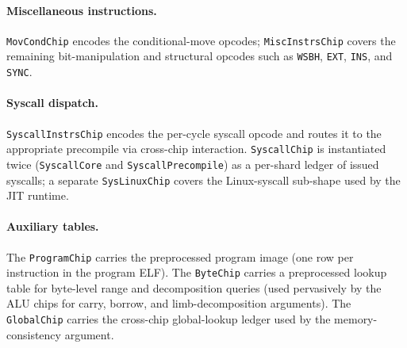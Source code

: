 \paragraph{Miscellaneous instructions.} \texttt{MovCondChip} encodes the conditional-move opcodes; \texttt{MiscInstrsChip} covers the remaining bit-manipulation and structural opcodes such as \texttt{WSBH}, \texttt{EXT}, \texttt{INS}, and \texttt{SYNC}.

\paragraph{Syscall dispatch.} \texttt{SyscallInstrsChip} encodes the per-cycle syscall opcode and routes it to the appropriate precompile via cross-chip interaction. \texttt{SyscallChip} is instantiated twice (\texttt{SyscallCore} and \texttt{SyscallPrecompile}) as a per-shard ledger of issued syscalls; a separate \texttt{SysLinuxChip} covers the Linux-syscall sub-shape used by the JIT runtime.

\paragraph{Auxiliary tables.} The \texttt{ProgramChip} carries the preprocessed program image (one row per instruction in the program ELF). The \texttt{ByteChip} carries a preprocessed lookup table for byte-level range and decomposition queries (used pervasively by the ALU chips for carry, borrow, and limb-decomposition arguments). The \texttt{GlobalChip} carries the cross-chip global-lookup ledger used by the memory-consistency argument.

